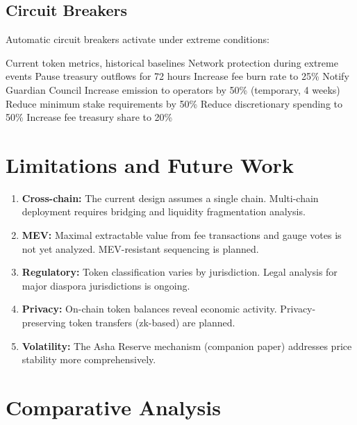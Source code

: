 \documentclass[11pt,a4paper]{article}
\begin{document}
\subsection{Circuit Breakers}

Automatic circuit breakers activate under extreme conditions:

\begin{algorithm}[H]
\caption{Economic Circuit Breaker}
\label{alg:circuit}
\begin{algorithmic}[1]
\Require Current token metrics, historical baselines
\Ensure Network protection during extreme events
    \State Pause treasury outflows for 72 hours
    \State Increase fee burn rate to 25\%
    \State Notify Guardian Council
\EndIf
{}
    \State Increase emission to operators by 50\% (temporary, 4 weeks)
    \State Reduce minimum stake requirements by 50\%
\EndIf
{}
    \State Reduce discretionary spending to 50\%
    \State Increase fee treasury share to 20\%
\EndIf
\end{algorithmic}
\end{algorithm}

\section{Limitations and Future Work}

\begin{enumerate}
    \item \textbf{Cross-chain:} The current design assumes a single chain. Multi-chain deployment requires bridging and liquidity fragmentation analysis.
    \item \textbf{MEV:} Maximal extractable value from fee transactions and gauge votes is not yet analyzed. MEV-resistant sequencing is planned.
    \item \textbf{Regulatory:} Token classification varies by jurisdiction. Legal analysis for major diaspora jurisdictions is ongoing.
    \item \textbf{Privacy:} On-chain token balances reveal economic activity. Privacy-preserving token transfers (zk-based) are planned.
    \item \textbf{Volatility:} The Asha Reserve mechanism (companion paper) addresses price stability more comprehensively.
\end{enumerate}

\section{Comparative Analysis}
\end{document}
